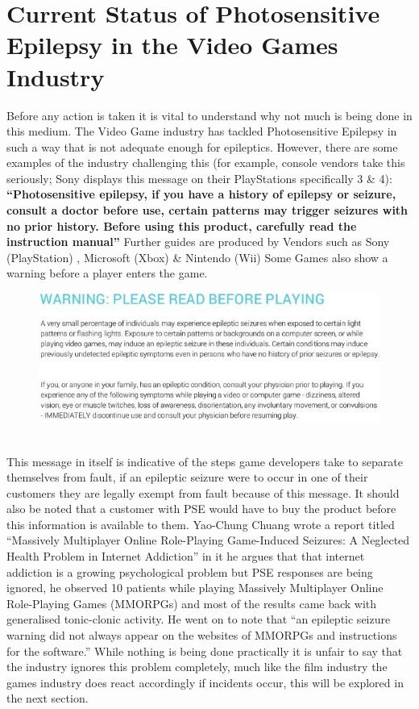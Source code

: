 \documentclass[twocolumn, 10pt, conference]{ieeetran}
\begin{document}
\section{Current Status of Photosensitive Epilepsy in the Video Games Industry}
Before any action is taken it is vital to understand why not much is being done in this medium. The Video Game industry has tackled Photosensitive Epilepsy in such a way that is not adequate enough for epileptics. However, there are some examples of the industry challenging this (for example, console vendors take this seriously; Sony displays this message on their PlayStations specifically 3 \& 4):
\textbf{“Photosensitive epilepsy, if you have a history of epilepsy or seizure, consult a doctor before use, certain patterns may trigger seizures with no prior history. Before using this product, carefully read the instruction manual”} Further guides are produced by Vendors such as Sony (PlayStation) \cite{PSHealth}, Microsoft (Xbox) \cite{MicrosoftHealth} \& Nintendo (Wii)\cite{NintendoHealth}
Some Games also show a warning before a player enters the game.
\begin{figure}[h]
	\centering
	\includegraphics[width=1\linewidth]{Warning}
	\caption{}
	\label{fig:warning}
\end{figure}
\\This message in itself is indicative of the steps game developers take to separate themselves from fault, if an epileptic seizure were to occur in one of their customers they are legally exempt from fault because of this message. It should also be noted that a customer with PSE would have to buy the product before this information is available to them. Yao-Chung Chuang wrote a report titled “Massively Multiplayer Online Role-Playing Game-Induced Seizures: A Neglected Health Problem in Internet Addiction” in it he argues that that internet addiction is a growing psychological problem but PSE responses are being ignored, he observed 10 patients while playing Massively Multiplayer Online Role-Playing Games (MMORPGs) and most of the results came back with generalised tonic-clonic activity. He went on to note that “an epileptic seizure warning did not always appear on the websites of MMORPGs and instructions for the software.” \cite{Chuang}
While nothing is being done practically it is unfair to say that the industry ignores this problem completely, much like the film industry the games industry does react accordingly if incidents occur, this will be explored in the next section.
\end{document}
